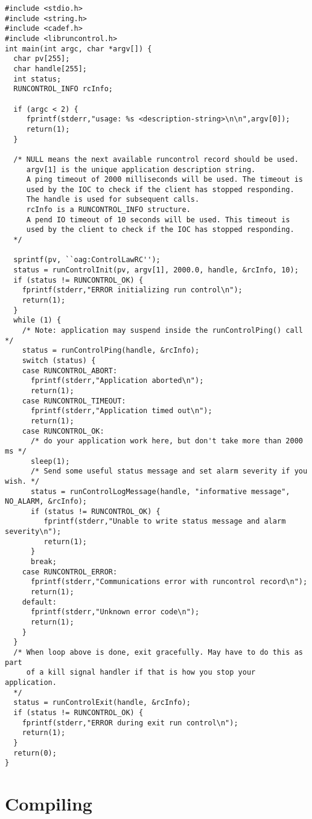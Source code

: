 \documentclass[11pt]{article}
\begin{document}
\begin{verbatim}
#include <stdio.h>
#include <string.h>
#include <cadef.h>
#include <libruncontrol.h>
int main(int argc, char *argv[]) {
  char pv[255];
  char handle[255];
  int status;
  RUNCONTROL_INFO rcInfo;

  if (argc < 2) {
     fprintf(stderr,"usage: %s <description-string>\n\n",argv[0]);
     return(1);
  }
  
  /* NULL means the next available runcontrol record should be used.
     argv[1] is the unique application description string.
     A ping timeout of 2000 milliseconds will be used. The timeout is
     used by the IOC to check if the client has stopped responding.
     The handle is used for subsequent calls.
     rcInfo is a RUNCONTROL_INFO structure.
     A pend IO timeout of 10 seconds will be used. This timeout is
     used by the client to check if the IOC has stopped responding.
  */

  sprintf(pv, ``oag:ControlLawRC'');
  status = runControlInit(pv, argv[1], 2000.0, handle, &rcInfo, 10);
  if (status != RUNCONTROL_OK) {
    fprintf(stderr,"ERROR initializing run control\n");
    return(1);
  }
  while (1) {
    /* Note: application may suspend inside the runControlPing() call */
    status = runControlPing(handle, &rcInfo);
    switch (status) {
    case RUNCONTROL_ABORT:
      fprintf(stderr,"Application aborted\n");
      return(1);
    case RUNCONTROL_TIMEOUT:
      fprintf(stderr,"Application timed out\n");
      return(1);
    case RUNCONTROL_OK:
      /* do your application work here, but don't take more than 2000 ms */
      sleep(1);
      /* Send some useful status message and set alarm severity if you wish. */
      status = runControlLogMessage(handle, "informative message", NO_ALARM, &rcInfo);
      if (status != RUNCONTROL_OK) {
         fprintf(stderr,"Unable to write status message and alarm severity\n");
         return(1);
      }
      break;
    case RUNCONTROL_ERROR:
      fprintf(stderr,"Communications error with runcontrol record\n");
      return(1);
    default:
      fprintf(stderr,"Unknown error code\n");
      return(1);
    }
  }
  /* When loop above is done, exit gracefully. May have to do this as part
     of a kill signal handler if that is how you stop your application.
  */
  status = runControlExit(handle, &rcInfo);
  if (status != RUNCONTROL_OK) {
    fprintf(stderr,"ERROR during exit run control\n");
    return(1);
  }
  return(0);
}
\end{verbatim}


\section{Compiling}
\end{document}

